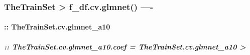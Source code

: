 \documentclass[
]{article}
\begin{document}
\hypertarget{thetrainset-f_df.cv.glmnet--}{%
\subsubsection{\texorpdfstring{TheTrainSet \textbar\textgreater{}
\textbf{f\_df.cv.glmnet}()
----}{TheTrainSet \textbar\textgreater{} f\_df.cv.glmnet() ----}}\label{thetrainset-f_df.cv.glmnet--}}

\hypertarget{thetrainset.cv.glmnet_a10}{%
\paragraph{::
TheTrainSet.cv.glmnet\_a10}\label{thetrainset.cv.glmnet_a10}}

\hypertarget{thetrainset.cv.glmnet_a10.coef-thetrainset.cv.glmnet_a10}{%
\subparagraph{:: TheTrainSet.cv.glmnet\_a10.coef =
TheTrainSet.cv.glmnet\_a10
\textbar\textgreater{}}\label{thetrainset.cv.glmnet_a10.coef-thetrainset.cv.glmnet_a10}}
\end{document}
